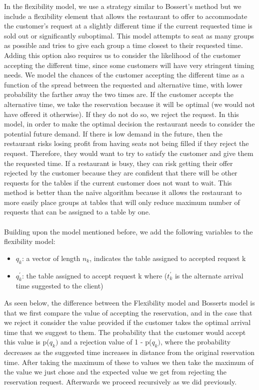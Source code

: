 \documentclass[12pt, titlepage]{article}
\begin{document}
In the flexibility model, we use a strategy similar to Bossert's method but we include a flexibility element that allows the restaurant to offer to accommodate the customer's request at a slightly different time if the current requested time is sold out or significantly suboptimal. This model attempts to seat as many groups as possible and tries to give each group a time closest to their requested time. Adding this option also requires us to consider the likelihood of the customer accepting the different time, since some customers will have very stringent timing needs. We model the chances of the customer accepting the different time as a function of the spread between the requested and alternative time, with lower probability the farther away the two times are. If the customer accepts the alternative time, we take the reservation because it will be optimal (we would not have offered it otherwise). If they do not do so, we reject the request. In this model, in order to make the optimal decision the restaurant needs to consider the potential future demand. If there is low demand in the future, then the restaurant risks losing profit from having seats not being filled if they reject the request. Therefore, they would want to try to satisfy the customer and give them the requested time. If a restaurant is busy, they can risk getting their offer rejected by the customer because they are confident that there will be other requests for the tables if the current customer does not want to wait. This method is better than the na\"{i}ve algorithm because it allows the restaurant to more easily place groups at tables that will only reduce maximum number of requests that can be assigned to a table by one.\\
\\
Building upon the model mentioned before, we add the following variables to the flexibility model:

\begin{itemize}
\item $q_{k}$: a vector of length $n_{k}$, indicates the table assigned to accepted request k
\item $q^{'}_{k}$: the table assigned to accept request k where ($t^{'}_{k}$ is the alternate arrival time suggested to the client)
\end{itemize}

As seen below, the difference between the Flexibility model and Bosserts model is that we first compare the value of accepting the reservation, and in the case that we reject it consider the value provided if the customer takes the optimal arrival time that we suggest to them. The probability that the customer would accept this value is p($q_{k})$ and a rejection value of 1 -  p($q_{k})$, where the probability decreases as the suggested time increases in distance from the original reservation time. After taking the maximum of these to values we then take the maximum of the value we just chose and the expected value we get from rejecting the reservation request. Afterwards we proceed recursively as we did previously.
\end{document}

